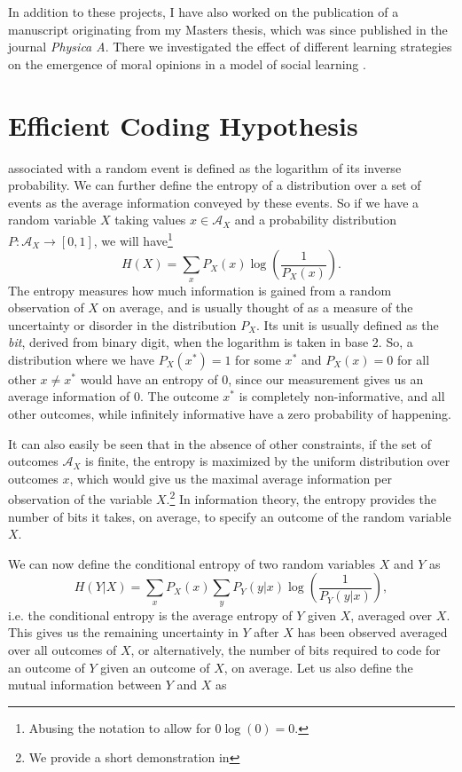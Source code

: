 In addition to these projects, I have also worked on the publication of a manuscript originating from my Masters thesis, which was since published in the journal 
\emph{Physica A}. There we investigated the effect of different learning strategies on the emergence of moral opinions in a model of social learning  
\citep{Vicente2014}.

\section{Efficient Coding Hypothesis}

 associated with a random event is defined as the logarithm of its inverse probability. We can further define the 
entropy of a distribution 
over a set of events as the average information conveyed by these events. So if we have a random variable $X$ taking values $x \in \mathcal{A}_X$ and a probability 
distribution $P : \mathcal{A}_X \to [0,1]$, we will have\footnote{Abusing the notation to allow for $0\log(0) = 0$.}
$$
H(X)= \sum_x P_X(x) \log\left(\frac{1}{P_X(x)}\right).
$$
The entropy measures how much information is gained from a random observation of $X$ on average, and is usually thought of as a measure of the uncertainty or 
disorder in the distribution $P_X$. Its unit is usually defined as the {\em bit}, derived from binary digit, when the logarithm is taken in base 2. So, a distribution where 
we have $P_X(x^*) = 1$ for some $x^*$ and $P_X(x) = 0$ for all other $x\neq x^*$ would have an entropy of $0$, since our measurement gives us an average 
information of $0$. The outcome $x^*$ is completely non-informative, and all other outcomes, while infinitely informative have a zero probability of happening.\par
It can also easily be seen that in the absence of other constraints, if the set of outcomes $\mathcal{A}_X$ is finite, the entropy is maximized by the uniform 
distribution over outcomes $x$, which would give us the maximal average information per observation of the variable $X$.\footnote{We provide a short demonstration in 
} In information theory, the entropy provides the number of bits it takes, on average, to specify an outcome of the random variable $X$.\par
We can now define the conditional entropy of two random variables $X$ and $Y$ as
$$
H(Y|X) = \sum_x P_X(x) \sum_y P_Y(y|x) \log\left(\frac{1}{P_Y(y|x)}\right),
$$
i.e. the conditional entropy is the average entropy of $Y$ given $X$, averaged over $X$. This gives us the remaining uncertainty in $Y$ after $X$ has been observed averaged over all outcomes of $X$, or alternatively, the number of bits required to code for an outcome of $Y$ given an outcome of $X$, on average. Let us also define the mutual information between $Y$ and $X$ as
